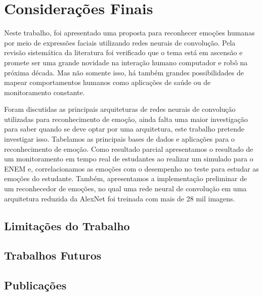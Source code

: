 \chapter{Considerações Finais}\label{sec:conclusao}
Neste trabalho, foi apresentado uma proposta para reconhecer emoções humanas por meio de expressões faciais utilizando redes neurais de convolução. Pela revisão sistemática da literatura foi verificado que o tema está em ascensão e promete ser uma grande novidade na interação humano computador e robô na próxima década. Mas não somente isso, há também grandes possibilidades de mapear comportamentos humanos como aplicações de saúde ou de monitoramento constante. 

Foram discutidas as principais arquiteturas de redes neurais de convolução utilizadas para reconhecimento de emoção, ainda falta uma maior investigação para saber quando se deve optar por uma arquitetura, este trabalho pretende investigar isso. Tabelamos as principais bases de dados e aplicações para o reconhecimento de emoção. Como resultado parcial apresentamos o resultado de um monitoramento em tempo real de estudantes ao realizar um simulado para o ENEM e, correlacionamos as emoções com o desempenho no teste para estudar as emoções do estudante. Também, apresentamos a implementação preliminar de um reconhecedor de emoções, no qual uma rede neural de convolução em uma arquitetura reduzida da AlexNet foi treinada com mais de 28 mil imagens.  



\section{Limitações do Trabalho}

\section{Trabalhos Futuros}

\section{Publicações}